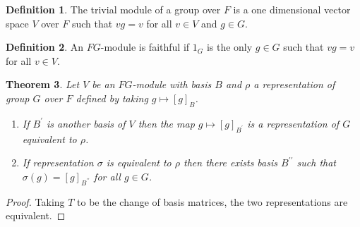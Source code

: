 \documentclass[11pt, notitlepage]{article}
\numberwithin{equation}{section}
\theoremstyle{plain}
\newtheorem{theorem}{Theorem}[section]
\theoremstyle{definition}
\newtheorem{definition}[theorem]{Definition}
\begin{document}
\begin{definition}
The trivial module of a group over $F$ is a one dimensional vector space $V$ over $F$ such that $v g = v$ for all $v \in V$ and $g \in G$.
\end{definition}

\begin{definition}
An $FG$-module is faithful if $1_G$ is the only $g \in G$ such that $v g = v$ for all $v \in V$.
\end{definition}


\begin{theorem}
Let $V$ be an $FG$-module with basis $B$ and $\rho$ a representation of group $G$ over $F$ defined by taking $g \mapsto [g]_B$.
\begin{enumerate}[label=(\roman*)]
	\item If $B^\prime$ is another basis of $V$ then the map $g \mapsto [g]_{B^\prime}$ is a representation of $G$ equivalent to $\rho$.
	\item If representation $\sigma$ is equivalent to $\rho$ then there exists basis $B^{\prime\prime}$ such that $\sigma(g) = [g]_{B^{\prime\prime}}$ for all $g \in G$.
\end{enumerate}
\end{theorem}

\begin{proof}
Taking $T$ to be the change of basis matrices, the two representations are equivalent.
\end{proof}
\end{document}
